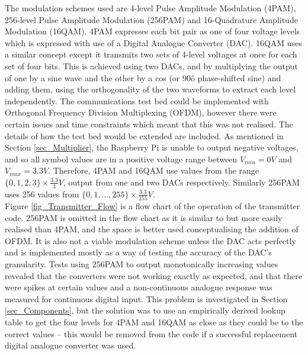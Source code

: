 \documentclass[../main.tex]{subfiles}
\begin{document}
The modulation schemes used are 4-level Pulse Amplitude Modulation (4PAM), 256-level Pulse Amplitude Modulation (256PAM) and 16-Quadrature Amplitude Modulation (16QAM).
4PAM expresses each bit pair as one of four voltage levels which is expressed with use of a Digital Analogue Converter (DAC).
16QAM uses a similar concept except it transmits two sets of 4-level voltages at once for each set of four bits.
This is achieved using two DACs, and by multiplying the output of one by a sine wave and the other by a cos (or 90\^o phase-shifted sine) and adding them, using the orthogonality of the two waveforms to extract each level independently.
The communications test bed could be implemented with Orthogonal Frequency Division Multiplexing (OFDM), however there were certain issues and time constraints which meant that this was not realised.
The details of how the test bed would be extended are included.
As mentioned in Section \ref{sec_Multiplier}, the Raspberry Pi is unable to output negative voltages, and so all symbol values are in a positive voltage range between $V_{min} = 0V$ and $V_{max} = 3.3V$.
Therefore, 4PAM and 16QAM use values from the range $\{0, 1, 2, 3\} \times \frac{3.3}{3}V$, output from one and two DACs respectively.
Similarly 256PAM uses 256 values from $\{0, 1, ..., 255\} \times \frac{3.3}{255}V$.\\

Figure \ref{fig_Transmitter_Flow} is a flow chart of the operation of the transmitter code.
256PAM is omitted in the flow chart as it is similar to but more easily realised than 4PAM, and the space is better used conceptualising the addition of OFDM.
It is also not a viable modulation scheme unless the DAC acts perfectly and is implemented mostly as a way of testing the accuracy of the DAC's granularity.
Tests using 256PAM to output monotonically increasing values revealed that the converters were not working exactly as expected, and that there were spikes at certain values and a non-continuous analogue response was measured for continuous digital input.
This problem is investigated in Section \ref{sec_Components}, but the solution was to use an empirically derived lookup table to get the four levels for 4PAM and 16QAM as close as they could be to the correct values -- this would be removed from the code if a successful replacement digital analogue converter was used.
\end{document}
